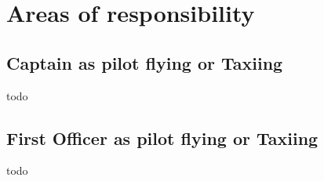 \section{Areas of responsibility}
\subsection{Captain as pilot flying or Taxiing}
todo
\subsection{First Officer as pilot flying or Taxiing}
todo
